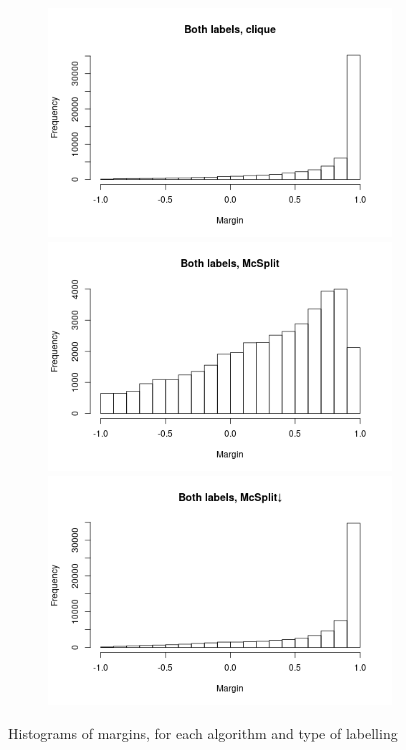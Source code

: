 \documentclass{l4proj}
\theoremstyle{definition}
\theoremstyle{remark}
\begin{document}
\begin{figure}
\begin{subfigure}[t]{0.49\textwidth}
  \end{subfigure}
  \begin{subfigure}[t]{0.49\textwidth}
    \centering
    \includegraphics[width=\textwidth]{images/both_labels_clique_hist.png}
    \includegraphics[width=\textwidth]{images/both_labels_mcsplit_hist.png}
    \includegraphics[width=\textwidth]{images/both_labels_mcsplitdown_hist.png}
  \end{subfigure}
  \caption{Histograms of margins, for each algorithm and type of labelling}
  \label{fig:margin_hist}
\end{figure}
\end{document}
